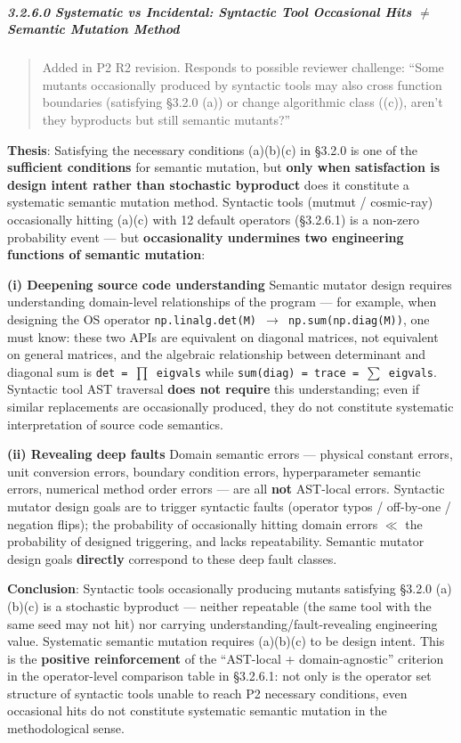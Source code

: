 \documentclass[review,12pt,authoryear]{elsarticle}
\begin{document}
\subparagraph{3.2.6.0 Systematic vs Incidental: Syntactic Tool
Occasional Hits $\neq$ Semantic Mutation
Method}\label{systematic-vs-incidental-syntactic-tool-occasional-hits-semantic-mutation-method}

\begin{quote}
Added in P2 R2 revision. Responds to possible reviewer challenge: ``Some
mutants occasionally produced by syntactic tools may also cross function
boundaries (satisfying §3.2.0 (a)) or change algorithmic class ((c)),
aren't they byproducts but still semantic mutants?''
\end{quote}

\textbf{Thesis}: Satisfying the necessary conditions (a)(b)(c) in §3.2.0
is one of the \textbf{sufficient conditions} for semantic mutation, but
\textbf{only when satisfaction is design intent rather than stochastic
byproduct} does it constitute a systematic semantic mutation method.
Syntactic tools (mutmut / cosmic-ray) occasionally hitting (a)(c) with
12 default operators (§3.2.6.1) is a non-zero probability event --- but
\textbf{occasionality undermines two engineering functions of semantic
mutation}:

\textbf{(i) Deepening source code understanding} Semantic mutator design
requires understanding domain-level relationships of the program --- for
example, when designing the OS operator
\texttt{np.linalg.det(M)\ $\to$\ np.sum(np.diag(M))}, one must know: these
two APIs are equivalent on diagonal matrices, not equivalent on general
matrices, and the algebraic relationship between determinant and
diagonal sum is \texttt{det\ =\ $\prod$\ eigvals} while
\texttt{sum(diag)\ =\ trace\ =\ $\sum$\ eigvals}. Syntactic tool AST
traversal \textbf{does not require} this understanding; even if similar
replacements are occasionally produced, they do not constitute
systematic interpretation of source code semantics.

\textbf{(ii) Revealing deep faults} Domain semantic errors --- physical
constant errors, unit conversion errors, boundary condition errors,
hyperparameter semantic errors, numerical method order errors --- are
all \textbf{not} AST-local errors. Syntactic mutator design goals are to
trigger syntactic faults (operator typos / off-by-one / negation flips);
the probability of occasionally hitting domain errors $\ll$ the probability
of designed triggering, and lacks repeatability. Semantic mutator design
goals \textbf{directly} correspond to these deep fault classes.

\textbf{Conclusion}: Syntactic tools occasionally producing mutants
satisfying §3.2.0 (a)(b)(c) is a stochastic byproduct --- neither
repeatable (the same tool with the same seed may not hit) nor carrying
understanding/fault-revealing engineering value. Systematic semantic
mutation requires (a)(b)(c) to be design intent. This is the
\textbf{positive reinforcement} of the ``AST-local + domain-agnostic''
criterion in the operator-level comparison table in §3.2.6.1: not only
is the operator set structure of syntactic tools unable to reach P2
necessary conditions, even occasional hits do not constitute systematic
semantic mutation in the methodological sense.
\end{document}
